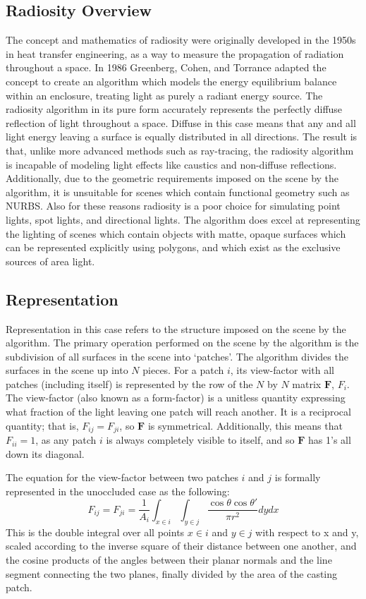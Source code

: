 \documentclass[letter]{article}
\newcommand{\vect}[1]{\boldsymbol{#1}}
\begin{document}
\subsection{Radiosity Overview}
The concept and mathematics of radiosity were originally developed in the 1950s in heat transfer engineering, as a way to measure the propagation of radiation throughout a space. In 1986 Greenberg, Cohen, and Torrance adapted the concept to create an algorithm which models the energy equilibrium balance within an enclosure, treating light as purely a radiant energy source.\cite{greenberg86} The radiosity algorithm in its pure form accurately represents the perfectly diffuse reflection of light throughout a space. Diffuse in this case means that any and all light energy leaving a surface is equally distributed in all directions. The result is that, unlike more advanced methods such as ray-tracing, the radiosity algorithm is incapable of modeling light effects like caustics and non-diffuse reflections. Additionally, due to the geometric requirements imposed on the scene by the algorithm, it is unsuitable for scenes which contain functional geometry such as NURBS. Also for these reasons radiosity is a poor choice for simulating point lights, spot lights, and directional lights. The algorithm does excel at representing the lighting of scenes which contain objects with matte, opaque surfaces which can be represented explicitly using polygons, and which exist as the exclusive sources of area light.

\subsection{Representation}
Representation in this case refers to the structure imposed on the scene by the algorithm. The primary operation performed on the scene by the algorithm is the subdivision of all surfaces in the scene into `patches'. The algorithm divides the surfaces in the scene up into $N$ pieces. For a patch $i$, its view-factor with all patches (including itself) is represented by the row of the $N$ by $N$ matrix $\vect{F}$, $F_i$. The view-factor (also known as a form-factor) is a unitless quantity expressing what fraction of the light leaving one patch will reach another. It is a reciprocal quantity; that is, $F_{ij} = F_{ji}$, so $\vect{F}$ is symmetrical. Additionally, this means that $F_{ii} = 1$, as any patch $i$ is always completely visible to itself, and so $\vect{F}$ has 1's all down its diagonal.

The equation for the view-factor between two patches $i$ and $j$ is formally represented in the unoccluded case as the following:\cite{sillion94}
\begin{equation}
F_{ij} = F_{ji} = \frac{1}{A_i} \int_{x \in i} \int_{y \in j} \frac{\cos \theta \cos \theta '}{\pi r^2}dydx
\end{equation}
This is the double integral over all points $x \in i$ and $y \in j$ with respect to x and y, scaled according to the inverse square of their distance between one another, and the cosine products of the angles between their planar normals and the line segment connecting the two planes, finally divided by the area of the casting patch.
\end{document}
